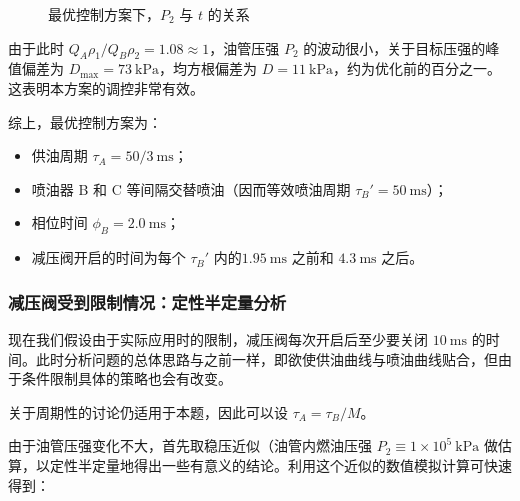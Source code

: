 \documentclass[withoutpreface,bwprint]{cumcmthesis}
\newcommand{\prb}{\times 10^5~\mathrm{kPa}}
\newcommand{\pre}{~\mathrm{kPa}}
\newcommand{\tim}{~\mathrm{ms}}
\newcommand{\pres}{/\mathrm{kPa}}
\newcommand{\tims}{/\mathrm{ms}}
\begin{document}
\begin{figure}[!ht]
	\centering
	\caption{最优控制方案下，$P_2$ 与 $t$ 的关系}
	\label{continuumPt}
\end{figure}

由于此时 $Q_A\rho_1/Q_B\rho_2=1.08\approx 1$，油管压强 $P_2$ 的波动很小，关于目标压强的峰值偏差为 $D_{\max}=73\pre$，均方根偏差为 $D=11\pre$，约为优化前的百分之一。这表明本方案的调控非常有效。

综上，最优控制方案为：

\begin{itemize}
	\item 供油周期 $\tau_A=50/3 \tim$；
	\item 喷油器 B 和 C 等间隔交替喷油（因而等效喷油周期 $\tau_B'=50\tim$）；
	\item 相位时间 $\phi_B=2.0\tim$；
	\item 减压阀开启的时间为每个 $\tau_B'$ 内的$1.95\tim$ 之前和 $4.3\tim$ 之后。
\end{itemize}

\subsubsection{减压阀受到限制情况：定性半定量分析}

现在我们假设由于实际应用时的限制，减压阀每次开启后至少要关闭 $10\tim$ 的时间。此时分析问题的总体思路与之前一样，即欲使供油曲线与喷油曲线贴合，但由于条件限制具体的策略也会有改变。

关于周期性的讨论仍适用于本题，因此可以设 $\tau_A=\tau_B/M$。

由于油管压强变化不大，首先取稳压近似（油管内燃油压强 $P_2\equiv 1\prb$ 做估算，以定性半定量地得出一些有意义的结论。利用这个近似的数值模拟计算可快速得到：
\end{document}
